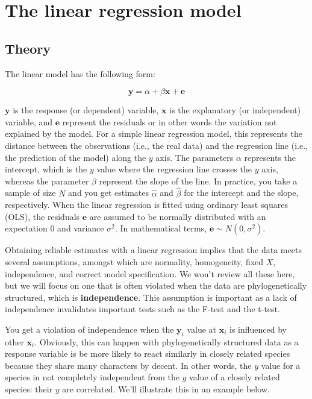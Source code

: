 \documentclass[
]{book}
\begin{document}
\hypertarget{linear-regression}{%
\chapter{The linear regression model}\label{linear-regression}}

\hypertarget{theory}{%
\section{Theory}\label{theory}}

The linear model has the following form:

\[\textbf{y} = \alpha + \beta \textbf{x} + \textbf{e}\]

\(\textbf{y}\) is the response (or dependent) variable, \(\textbf{x}\) is the explanatory (or independent) variable, and \(\textbf{e}\) represent the residuals or in other words the variation not explained by the model. For a simple linear regression model, this represents the distance between the observations (i.e., the real data) and the regression line (i.e., the prediction of the model) along the \(y\) axis. The parameters \(\alpha\) represents the intercept, which is the \(y\) value where the regression line crosses the \(y\) axis, whereas the parameter \(\beta\) represent the slope of the line. In practice, you take a sample of size \(N\) and you get estimates \(\hat{\alpha}\) and \(\hat{\beta}\) for the intercept and the slope, respectively. When the linear regression is fitted using ordinary least squares (OLS), the residuals \(\textbf{e}\) are assumed to be normally distributed with an expectation \(0\) and variance \(\sigma^2\). In mathematical terms, \(\textbf{e} \sim N(0,\sigma^2)\).

Obtaining reliable estimates with a linear regression implies that the data meets several assumptions, amongst which are normality, homogeneity, fixed \(X\), independence, and correct model specification. We won't review all these here, but we will focus on one that is often violated when the data are phylogenetically structured, which is \textbf{independence}. This assumption is important as a lack of independence invalidates important tests such as the F-test and the t-test.

You get a violation of independence when the \(\textbf{y}_i\) value at \(\textbf{x}_i\) is influenced by other \(\textbf{x}_i\). Obviously, this can happen with phylogenetically structured data as a response variable is be more likely to react similarly in closely related species because they share many characters by decent. In other words, the \(y\) value for a species in not completely independent from the \(y\) value of a closely related species: their \(y\) are correlated. We'll illustrate this in an example below.
\end{document}
